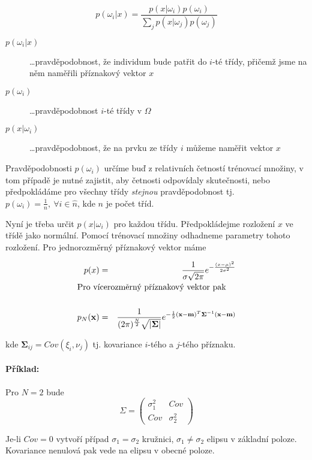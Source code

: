 \begin{equation}
p(\omega_i|x)=\frac{p(x|\omega_i)p(\omega_i)}{\sum\limits_j p(x|\omega_j)p(\omega_j)}
\end{equation}

\begin{description}
\item[$p(\omega_i|x)$] \dots  pravděpodobnost, že individum bude patřit do $i$-té třídy, přičemž 
jsme na něm naměřili příznakový vektor $x$
\item[$p(\omega_i)$] \dots pravděpodobnost $i$-té třídy v $\Omega$
\item[$p(x|\omega_i)$] \dots  pravděpodobnost, že na prvku ze třídy $i$ můžeme naměřit vektor  $x$
\end{description}

Pravděpodobnosti $p(\omega_i)$ určíme buď z relativních četností trénovací množiny, v tom případě je nutné
zajistit, aby četnosti odpovídaly skutečnosti, nebo předpokládáme pro všechny třídy {\em stejnou} pravděpodobnost
tj. $p(\omega_i)=\frac{1}{n},\ \forall i\in \hat{n}$, kde $n$ je počet tříd.

Nyní je třeba určit $p(x|\omega_i)$ pro každou třídu. Předpokládejme rozložení $x$ ve třídě jako normální. Pomocí
trénovací množiny odhadneme parametry tohoto rozložení. Pro jednorozměrný příznakový vektor máme

\def\x{\mathbf{x}}
\def\m{\mathbf{m}}
\def\bSigma{\mathbf{\Sigma}}

\begin{eqnarray}
p(x)&=&\frac{1}{\sigma \sqrt{2\pi}}e^{-\frac{(x-\mu)^2}{2\sigma^2}}\\
\noalign{\hbox{Pro vícerozměrný příznakový vektor pak}\nonumber}\\
p_N(\x)&=&\frac{1}{(2\pi)^\frac{N}{2}\sqrt{|\bSigma|}}e^{-\frac{1}{2}(\x-\m)^T\bSigma^{-1}(\x-\m)}
\end{eqnarray}

kde $\bSigma_{ij}=Cov(\xi_i,\nu_j)$ tj. kovariance $i$-tého a $j$-tého příznaku.

\paragraph{Příklad:}
Pro $N=2$ bude
$$
\Sigma=\left(\begin{array}{cc}\sigma_1^2 & Cov\\ Cov & \sigma_2^2\end{array}\right)
$$

Je-li $Cov=0$ vytvoří případ $\sigma_1=\sigma_2$ kružnici, $\sigma_1\neq\sigma_2$ elipsu v základní poloze.
Kovariance nenulová pak vede na elipsu v obecné poloze.

